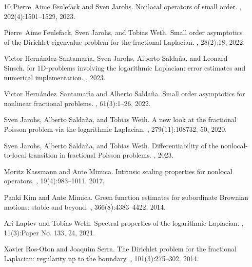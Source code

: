 \documentclass[11pt]{article}
\numberwithin{equation}{section}
\begin{document}
\begin{thebibliography}{10}
Pierre~Aime Feulefack and Sven Jarohs.
\newblock Nonlocal operators of small order.
, 202(4):1501--1529, 2023.

Pierre~Aime Feulefack, Sven Jarohs, and Tobias Weth.
\newblock Small order asymptotics of the {D}irichlet eigenvalue problem for the
  fractional {L}aplacian.
, 28(2):18, 2022.

V{\'\i}ctor Hern{\'a}ndez-Santamar{\'\i}a, Sven Jarohs, Alberto Salda{\~n}a,
  and Leonard Sinsch.
 for 1{D}-problems involving the logarithmic {L}aplacian: error
  estimates and numerical implementation.
, 2023.

V{\'\i}ctor Hern{\'a}ndez~Santamar{\'\i}a and Alberto Salda{\~n}a.
\newblock Small order asymptotics for nonlinear fractional problems.
,
  61(3):1--26, 2022.

Sven Jarohs, Alberto Salda\~{n}a, and Tobias Weth.
\newblock A new look at the fractional {P}oisson problem via the logarithmic
  {L}aplacian.
, 279(11):108732, 50, 2020.

Sven Jarohs, Alberto Salda{\~n}a, and Tobias Weth.
\newblock Differentiability of the nonlocal-to-local transition in fractional
  {P}oisson problems.
, 2023.

Moritz Kassmann and Ante Mimica.
\newblock Intrinsic scaling properties for nonlocal operators.
, 19(4):983--1011, 2017.

Panki Kim and Ante Mimica.
\newblock Green function estimates for subordinate {B}rownian motions: stable
  and beyond.
,
  366(8):4383--4422, 2014.

Ari Laptev and Tobias Weth.
\newblock Spectral properties of the logarithmic {L}aplacian.
, 11(3):Paper No. 133, 24, 2021.

Xavier Ros-Oton and Joaquim Serra.
\newblock The {D}irichlet problem for the fractional {L}aplacian: regularity up
  to the boundary.
,
  101(3):275--302, 2014.

\end{thebibliography}
\end{document}
